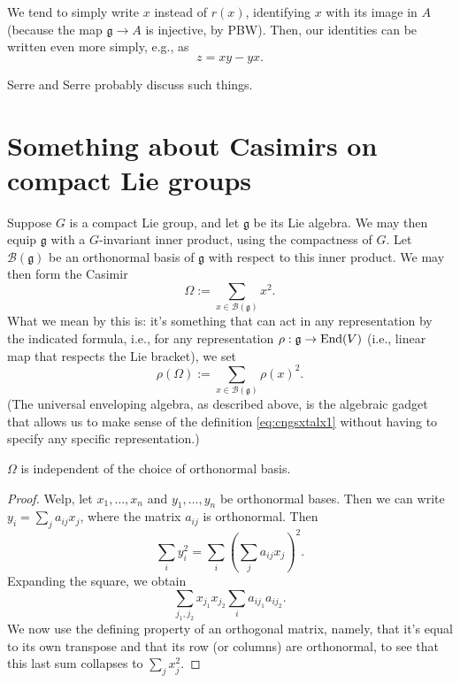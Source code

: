 \documentclass[reqno]{amsart} 
\begin{document}
We tend to simply write $x$ instead of $r(x)$, identifying $x$ with its image in $A$ (because the map $\mathfrak{g} \rightarrow A$ is injective, by PBW).  Then, our identities can be written even more simply, e.g., as
\begin{equation*}
  z = x y - y x.
\end{equation*}


Serre \cite{MR1808366} and Serre \cite{MR2179691} probably discuss such things.

\section{Something about Casimirs on compact Lie groups}\label{sec:cngsxurggj}
Suppose $G$ is a compact Lie group, and let $\mathfrak{g}$ be its Lie algebra.  We may then equip $\mathfrak{g}$ with a $G$-invariant inner product, using the compactness of $G$.  Let $\mathcal{B}(\mathfrak{g})$ be an orthonormal basis of $\mathfrak{g}$ with respect to this inner product.  We may then form the Casimir
\begin{equation}\label{eq:cngsxtalx1}
  \Omega := \sum_{x \in \mathcal{B}(\mathfrak{g})} x^2.
\end{equation}
What we mean by this is: it's something that can act in any representation by the indicated formula, i.e., for any representation $\rho : \mathfrak{g} \rightarrow \operatorname{End}(V)$ (i.e., linear map that respects the Lie bracket), we set
\begin{equation*}
  \rho(\Omega) := \sum_{x \in \mathcal{B}(\mathfrak{g})} \rho(x)^2.
\end{equation*}
(The universal enveloping algebra, as described above, is the algebraic gadget that allows us to make sense of the definition \eqref{eq:cngsxtalx1} without having to specify any specific representation.)

\begin{fact}\label{fact:cngsxurkz3}
  $\Omega$ is independent of the choice of orthonormal basis.
\end{fact}
\begin{proof}
  Welp, let $x_1, \dotsc, x_n$ and $y_1, \dotsc, y_n$ be orthonormal bases.  Then we can write $y_i = \sum_j a_{i j} x_j$, where the matrix $a_{i j}$ is orthonormal.  Then
  \begin{equation*}
    \sum_{i} y_i^2 = \sum_i \left( \sum_j a_{i j} x_j \right)^2.
  \end{equation*}
  Expanding the square, we obtain
  \begin{equation*}
    \sum_{j_1, j_2} x_{j_1} x_{j_2} \sum_i a_{i j_1} a_{i j_2}.
  \end{equation*}
  We now use the defining property of an orthogonal matrix, namely, that it's equal to its own transpose and that its row (or columns) are orthonormal, to see that this last sum collapses to $\sum_j x_j^2$.
\end{proof}
\end{document}
